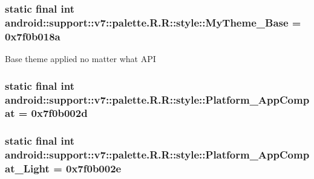 \hypertarget{classandroid_1_1support_1_1v7_1_1palette_1_1_r_1_1style_f5c04eead4f466685d4258779237cc7d}{
\subsubsection[{MyTheme\_\-Base}]{\setlength{\rightskip}{0pt plus 5cm}static final int android::support::v7::palette.R.R::style::MyTheme\_\-Base = 0x7f0b018a}}
\label{classandroid_1_1support_1_1v7_1_1palette_1_1_r_1_1style_f5c04eead4f466685d4258779237cc7d}


Base theme applied no matter what API \hypertarget{classandroid_1_1support_1_1v7_1_1palette_1_1_r_1_1style_b688cbdd74bd73fc80360b984a9e3ff1}{
\subsubsection[{Platform\_\-AppCompat}]{\setlength{\rightskip}{0pt plus 5cm}static final int android::support::v7::palette.R.R::style::Platform\_\-AppCompat = 0x7f0b002d}}
\label{classandroid_1_1support_1_1v7_1_1palette_1_1_r_1_1style_b688cbdd74bd73fc80360b984a9e3ff1}


\hypertarget{classandroid_1_1support_1_1v7_1_1palette_1_1_r_1_1style_f5328ad3edbc746c1e2e172b1766bb95}{
\subsubsection[{Platform\_\-AppCompat\_\-Light}]{\setlength{\rightskip}{0pt plus 5cm}static final int android::support::v7::palette.R.R::style::Platform\_\-AppCompat\_\-Light = 0x7f0b002e}}
\label{classandroid_1_1support_1_1v7_1_1palette_1_1_r_1_1style_f5328ad3edbc746c1e2e172b1766bb95}



